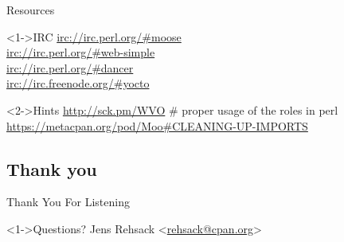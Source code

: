 \documentclass[ngerman,xcolor={table,dvipsnames},smaller,compress,hyperref={bookmarks,colorlinks},handout]{beamer}%
\begin{document}
\begin{frame}[t,fragile]{Resources}
\begin{block}<1->{IRC}
\url{irc://irc.perl.org/#moose} \\
\url{irc://irc.perl.org/#web-simple} \\
\url{irc://irc.perl.org/#dancer} \\
\url{irc://irc.freenode.org/#yocto}
\end{block}

\begin{block}<2->{Hints}
\url{http://sck.pm/WVO} \# proper usage of the roles in perl \\
\url{https://metacpan.org/pod/Moo\#CLEANING-UP-IMPORTS}
\end{block}
\end{frame}

\subsection{Thank you}

\begin{frame}[fragile]{Thank You For Listening}
\begin{block}<1->{Questions?}
Jens Rehsack \textless{}\href{mailto:rehsack@cpan.org}{rehsack@cpan.org}\textgreater{}
\end{block}
\end{frame}
\end{document}
